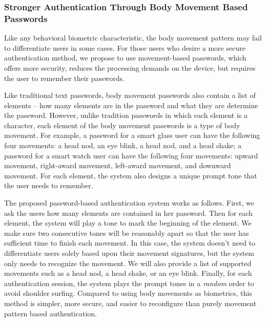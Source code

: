\subsubsection{Stronger Authentication Through Body Movement Based Passwords}\label{subsec:password}
Like any behavioral biometric characteristic, the body movement pattern may fail to differentiate users in some cases. For those users who desire a more secure authentication method, we propose to use movement-based passwords, which offers more security, reduces the processing demands on the device, but requires the user to remember their passwords.

Like traditional text passwords, body movement passwords also contain a list of elements -- how many elements are in the password and what they are determine the password. However, unlike tradition passwords in which each element is a character, each element of the body movement passwords is a type of body movement. For example, a password for a smart glass user can have the following four movements: a head nod, an eye blink, a head nod, and a head shake; a password for a smart watch user can have the following four movements: upward movement, right-award movement, left-award movement, and downward movement. For each element, the system also designs a unique prompt tone that the user needs to remember. 

The proposed password-based authentication system works as follows. First, we ask the users how many elements are contained in her password. Then for each element, the system will play a tone to mark the beginning of the element. We make sure two consecutive tones will be reasonably apart so that the user has sufficient time to finish each movement. In this case, the system doesn't need to differentiate users solely based upon their movement signatures, but the system only needs to recognize the movement. We will also provide a list of supported movements such as a head nod, a head shake, or an eye blink. Finally, for each authentication session, the system plays the prompt tones in a \emph{random} order to avoid shoulder surfing. Compared to using body movements as biometrics, this method is simpler, more secure, and easier to reconfigure than purely movement pattern based authentication. 


